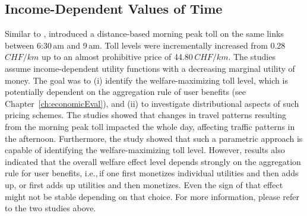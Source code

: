 \subsection{Income-Dependent Values of Time}
Similar to \citet{RieserEtAl_TRBTDF_2008}, \citet{KickhoeferEtAl2010EconomicEvaluationPublicAcceptanceRoadPricingKuhmo, Kickhoefer_PhDThesis_2014} introduced a distance-based morning peak toll on the same links between 6:30\,am and 9\,am. Toll levels were incrementally increased from 0.28\,$CHF/km$ up to an almost prohibitive price of 44.80\,$CHF/km$. The studies assume income-dependent utility functions with a decreasing marginal utility of money. The goal was to (i) identify the welfare-maximizing 
toll level, which  is potentially dependent on the aggregation rule of user benefits (see Chapter~\ref{ch:economicEval}), and (ii) to investigate distributional aspects of such pricing schemes.
%
The studies showed that changes in travel patterns resulting from the morning peak toll impacted the whole day, affecting traffic patterns in the afternoon.
%
Furthermore, the study showed that such a parametric approach is capable of identifying the welfare-maximizing toll level. However, results also indicated that the overall welfare effect level depends strongly on the aggregation rule for user benefits, i.e.,\,if one first monetizes individual utilities and then adds up, or first adds up utilities and then monetizes. 
Even the sign of that effect might not be stable depending on that choice.
%
For more information, please refer to the two studies above.


